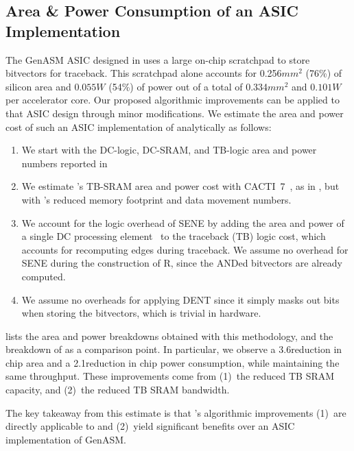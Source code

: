 \subsection{Area \& Power Consumption of an ASIC Implementation} \label{sec:hw_benefits}
The GenASM ASIC designed in \citep{cali2020genasm} uses a large on-chip scratchpad to store bitvectors for traceback. This scratchpad alone accounts for 0.256$mm^2$ (76\%) of silicon area and $0.055W$ (54\%) of power out of a total of 0.334$mm^2$ and $0.101W$ per accelerator core. Our proposed algorithmic improvements can be applied to that ASIC design through minor modifications. We estimate the area and power cost of such an ASIC implementation of \toolname analytically as follows:
\begin{enumerate}
    \item We start with the DC-logic, DC-SRAM, and TB-logic area and power numbers reported in \citep{cali2020genasm}
    \item We estimate \toolname's TB-SRAM area and power cost with CACTI~7~\citep{balasubramonian2017cacti}, as in \citep{cali2020genasm}, but with \toolname's reduced memory footprint and data movement numbers.
    \item We account for the logic overhead of SENE by adding the area and power of a single DC processing element~\citep{cali2020genasm} to the traceback (TB) logic cost, which accounts for recomputing edges during traceback. We assume no overhead for SENE during the construction of R, since the ANDed bitvectors are already computed.
    \item We assume no overheads for applying DENT since it simply masks out bits when storing the bitvectors, which is trivial in hardware.
\end{enumerate}


 lists the area and power breakdowns obtained with this methodology, and the breakdown of \citep{cali2020genasm} as a comparison point. In particular, we observe a 3.6\x reduction in chip area and a 2.1\x reduction in chip power consumption, while maintaining the same throughput. These improvements come from (1)~the reduced TB SRAM capacity, and (2)~the reduced TB SRAM bandwidth. 

The key takeaway from this estimate is that \toolname's algorithmic improvements (1)~are directly applicable to and (2)~yield significant benefits over an ASIC implementation of GenASM.


